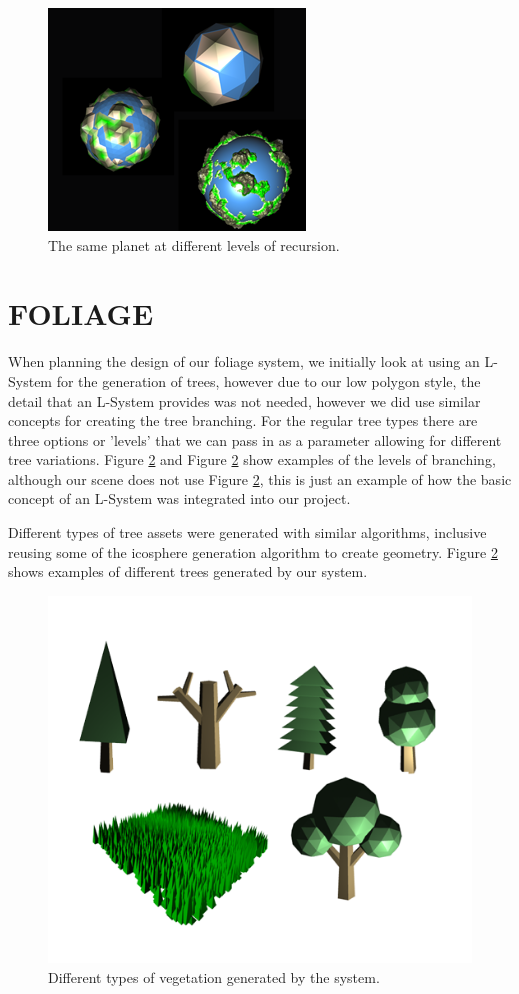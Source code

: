 \documentclass[a4paper,twoside]{article}
\begin{document}
\begin{figure}
\centering
\includegraphics[scale=0.75]{./images/planets/planets.png}
\caption{The same planet at different levels of recursion.}
\label{fig_iterations}
\end{figure}

\section{\uppercase{Foliage}}
\label{sec:fol}
\noindent When planning the design of our foliage system, we initially look at using an L-System for the generation of trees, however due to our low polygon style, the detail that an L-System provides  was not needed, however we did use similar concepts for creating the tree branching. 
For the regular tree types there are three options or 'levels' that we can pass in as a parameter allowing for different tree variations. Figure \ref{fig_all_trees} and Figure \ref{fig_all_trees} show examples of the levels of branching, although our scene does not use Figure \ref{fig_all_trees}, this is just an example of how the basic concept of an L-System was integrated into our project.

Different types of tree assets were generated with similar algorithms, inclusive reusing some of the icosphere generation algorithm to create geometry. Figure \ref{fig_all_trees} shows examples of different trees generated by our system.

\begin{figure}
\centering
\includegraphics[scale=0.3]{./images/trees/alltrees.png}
\caption{Different types of vegetation generated by the system.}
\label{fig_all_trees}
\end{figure}


{\small
}
\vfill
\end{document}
